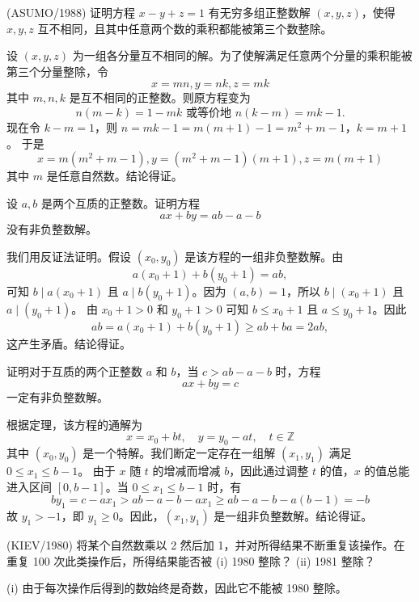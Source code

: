 \begin{questions}
\question (ASUMO/1988) 证明方程 $x - y + z = 1$ 有无穷多组正整数解 $(x, y, z)$，使得 $x, y, z$ 互不相同，且其中任意两个数的乘积都能被第三个数整除。

\begin{solution}
设 $(x, y, z)$ 为一组各分量互不相同的解。为了使解满足任意两个分量的乘积能被第三个分量整除，令
\[
x = mn, y = nk, z = mk
\]
其中 $m, n, k$ 是互不相同的正整数。则原方程变为
\[
n(m - k) = 1 - mk \text{ 或等价地 } n(k - m) = mk - 1.
\]
现在令 $k - m = 1$，则 $n = mk - 1 = m(m + 1) - 1 = m^2 + m - 1$，$k = m + 1$。
于是
\[
x = m(m^2 + m - 1), y = (m^2 + m - 1)(m + 1), z = m(m + 1)
\]
其中 $m$ 是任意自然数。结论得证。
\end{solution}

\question 设 $a, b$ 是两个互质的正整数。证明方程
\[
ax + by = ab - a - b
\]
没有非负整数解。

\begin{solution}
我们用反证法证明。假设 $(x_0, y_0)$ 是该方程的一组非负整数解。由
\[
a(x_0 + 1) + b(y_0 + 1) = ab,
\]
可知 $b \mid a(x_0 + 1)$ 且 $a \mid b(y_0 + 1)$。因为 $(a, b) = 1$，所以 $b \mid (x_0 + 1)$ 且 $a \mid (y_0 + 1)$。
由 $x_0 + 1 > 0$ 和 $y_0 + 1 > 0$ 可知 $b \le x_0 + 1$ 且 $a \le y_0 + 1$。因此
\[
ab = a(x_0 + 1) + b(y_0 + 1) \ge ab + ba = 2ab,
\]
这产生矛盾。结论得证。
\end{solution}

\question 证明对于互质的两个正整数 $a$ 和 $b$，当 $c > ab - a - b$ 时，方程
\[
ax + by = c
\]
一定有非负整数解。

\begin{solution}
根据定理，该方程的通解为
\[
x = x_0 + bt, \quad y = y_0 - at, \quad t \in \mathbb{Z}
\]
其中 $(x_0, y_0)$ 是一个特解。我们断定一定存在一组解 $(x_1, y_1)$ 满足 $0 \le x_1 \le b - 1$。
由于 $x$ 随 $t$ 的增减而增减 $b$，因此通过调整 $t$ 的值，$x$ 的值总能进入区间 $[0, b - 1]$。当 $0 \le x_1 \le b - 1$ 时，有
\[
by_1 = c - ax_1 > ab - a - b - ax_1 \ge ab - a - b - a(b - 1) = -b
\]
故 $y_1 > -1$，即 $y_1 \ge 0$。因此，$(x_1, y_1)$ 是一组非负整数解。结论得证。
\end{solution}

\question (KIEV/1980) 将某个自然数乘以 2 然后加 1，并对所得结果不断重复该操作。在重复 100 次此类操作后，所得结果能否被 (i) 1980 整除？ (ii) 1981 整除？

\begin{solution}
(i) 由于每次操作后得到的数始终是奇数，因此它不能被 1980 整除。


\end{solution}
\end{questions}
